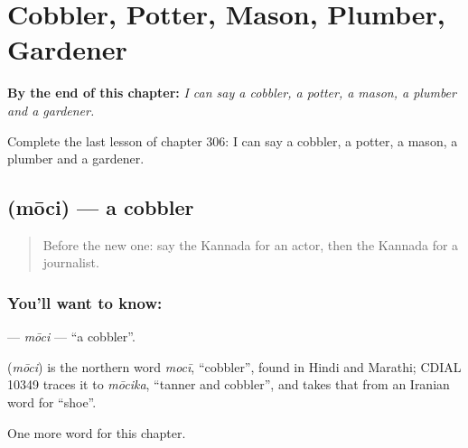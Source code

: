 
\chapter{Cobbler, Potter, Mason, Plumber, Gardener}
\label{ch:ka-cobbler-potter-mason-plumber-gardener}

\begin{chapteropening}
\textbf{By the end of this chapter:} \emph{I can say a cobbler, a potter, a mason, a plumber and a gardener.}

Complete the last lesson of chapter 306: I can say a cobbler, a potter, a mason, a plumber and a gardener.
\end{chapteropening}

\section[\texorpdfstring{\kn{ಮೋಚಿ} (mōci)}{ಮೋಚಿ (mōci)}]{ (mōci) — a cobbler}

\label{lesson:KA-C306-moci}



\begin{quote}
Before the new one: say the Kannada for an actor, then the Kannada for a journalist.
\end{quote}

\subsection*{You'll want to know: }
\textbf{} — \emph{mōci} — \textquotedblleft{}a cobbler\textquotedblright{}.

\begin{cousinweb}
\textbf{} (\emph{mōci}) is the northern word \emph{mocī}, \textquotedblleft{}cobbler\textquotedblright{}, found in Hindi and Marathi; CDIAL 10349 traces it to \emph{mōcika}, \textquotedblleft{}tanner and cobbler\textquotedblright{}, and takes that from an Iranian word for \textquotedblleft{}shoe\textquotedblright{}.
\end{cousinweb}

\begin{grammarlens}[title={What you've built}]
One more word for this chapter.
\end{grammarlens}

